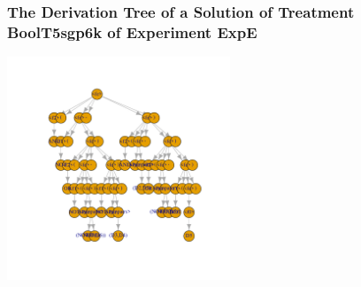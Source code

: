  \begin{frame}
 \frametitle{ The Derivation Tree of a Solution of Treatment BoolT5sgp6k of Experiment ExpE }
 \begin{center}
\includegraphics[width=0.5\textwidth, angle=0]
{ExpEDerivationTreeFigure009.pdf}
 \end{center}
 \label{report/ExpEDerivationTreeFigure009.pdf}  
 \end{frame}

